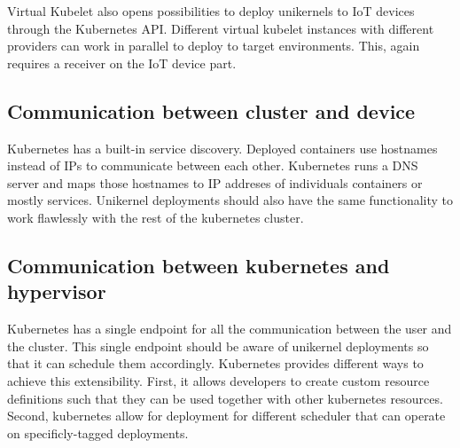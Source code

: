 Virtual Kubelet also opens possibilities to deploy unikernels to IoT devices through the Kubernetes API. Different virtual kubelet instances with different providers can work in parallel to deploy to target environments. This, again requires a receiver on the IoT device part. 


\subsection{Communication between cluster and device}
Kubernetes has a built-in service discovery. Deployed containers use hostnames instead of IPs to communicate between each other. Kubernetes runs a DNS server and maps those hostnames to IP addreses of individuals containers or mostly services. Unikernel deployments should also have the same functionality to work flawlessly with the rest of the kubernetes cluster. 

\subsection{Communication between kubernetes and hypervisor}
Kubernetes has a single endpoint for all the communication between the user and the cluster. This single endpoint should be aware of unikernel deployments so that it can schedule them accordingly. Kubernetes provides different ways to achieve this extensibility. First, it allows developers to create custom resource definitions such that they can be used together with other kubernetes resources. Second, kubernetes allow for deployment for different scheduler that can operate on specificly-tagged deployments. 
